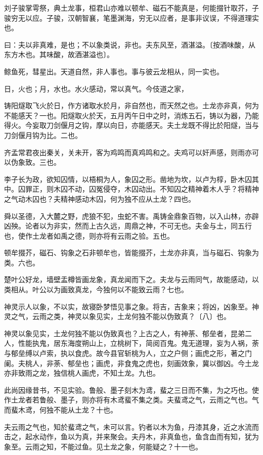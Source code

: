 \documentclass[]{article}
\begin{document}
刘子骏掌雩祭，典土龙事，桓君山亦难以顿牟、磁石不能真是，何能掇针取芥，子骏穷无以应。子骏，汉朝智襄，笔墨渊海，穷无以应者，是事非议误，不得道理实也。

曰：夫以非真难，是也；不以象类说，非也。夫东风至，酒湛溢。〔按酒味酸，从东方木也。其味酸，故酒湛溢也〕。

鲸鱼死，彗星出。天道自然，非人事也。事与彼云龙相从，同一实也。

日，火也；月，水也。水火感动，常以真气。今伎道之家，

铸阳燧取飞火於日，作方诸取水於月，非自然也，而天然之也。土龙亦非真，何为不能感天？一也。阳燧取火於天，五月丙午日中之时，消炼五石，铸以为器，乃能得火。今妄取刀剑偃月之钩，摩以向日，亦能感天。夫土龙既不得比於阳燧，当与刀剑偃月钩为比。二也。

齐孟常君夜出秦关，关未开，客为鸡鸣而真鸡鸣和之。夫鸡可以奸声感，则雨亦可以伪象致。三也。

李子长为政，欲知囚情，以梧桐为人，象囚之形。凿地为坎，以卢为椁，卧木囚其中。囚罪正，则木囚不动，囚冤侵夺，木囚动出。不知囚之精神着木人乎？将精神之气动木囚也？夫精神感动木囚，何为独不应从土龙？四也。

舜以圣德，入大麓之野，虎狼不犯，虫蛇不害。禹铸金鼎象百物，以入山林，亦辟凶殃。论者以为非实，然而上古久远，周鼎之神，不可无也。夫金与土，同五行也，使作土龙者如禹之德，则亦将有云雨之验。五也。

顿牟掇芥，磁石、钩象之石非顿牟也，皆能掇芥，土龙亦非真，当与磁石、钩象为类。六也。

楚叶公好龙，墙壁盂樽皆画龙象，真龙闻而下之。夫龙与云雨同气，故能感动，以类相从。叶公以为画致真龙，今独何以不能致云雨？七也。

神灵示人以象，不以实，故寝卧梦悟见事之象。将吉，吉象来；将凶，凶象至。神灵之气，云雨之类，神灵以象见实，土龙何独不能以伪致真？〔八〕也。

神灵以象见实，土龙何独不能以伪致真也？上古之人，有神荼、郁垒者，昆弟二人，性能执鬼，居东海度朔山上，立桃树下，简阅百鬼。鬼无道理，妄为人祸，荼与郁垒缚以卢索，执以食虎。故今县官斩桃为人，立之户侧；画虎之形，著之门阑。夫桃人，非荼、郁垒也；画虎，非食鬼之虎也，刻画效象，冀以御凶。今土龙亦非致雨之龙，独信桃人画虎，不知土龙。九也。

此尚因缘昔书，不见实验。鲁般、墨子刻木为鸢，蜚之三日而不集，为之巧也。使作土龙者若鲁般、墨子，则亦将有木鸢蜚不集之类。夫蜚鸢之气，云雨之气也。气而蜚木鸢，何独不能从土龙？十也。

夫云雨之气也，知於蜚鸢之气，未可以言。钓者以木为鱼，丹漆其身，近之水流而击之，起水动作，鱼以为真，并来聚会。夫丹木，非真鱼也，鱼含血而有知，犹为象至。云雨之知，不能过鱼。见土龙之象，何能疑之？十一也。
\end{document}
